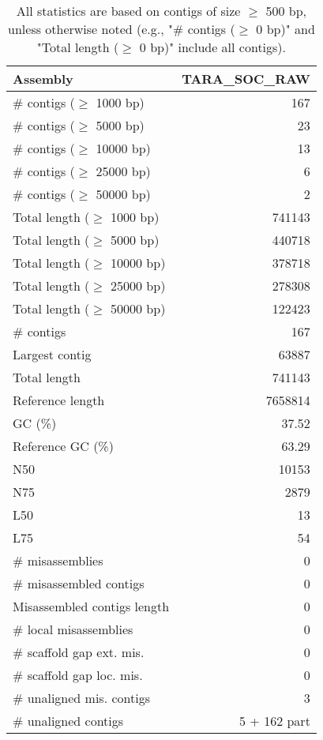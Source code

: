 \documentclass[12pt,a4paper]{article}
\begin{document}
\begin{table}[ht]
\begin{center}
\caption{All statistics are based on contigs of size $\geq$ 500 bp, unless otherwise noted (e.g., "\# contigs ($\geq$ 0 bp)" and "Total length ($\geq$ 0 bp)" include all contigs).}
\begin{tabular}{|l*{1}{|r}|}
\hline
Assembly & TARA\_SOC\_RAW \\ \hline
\# contigs ($\geq$ 1000 bp) & 167 \\ \hline
\# contigs ($\geq$ 5000 bp) & 23 \\ \hline
\# contigs ($\geq$ 10000 bp) & 13 \\ \hline
\# contigs ($\geq$ 25000 bp) & 6 \\ \hline
\# contigs ($\geq$ 50000 bp) & 2 \\ \hline
Total length ($\geq$ 1000 bp) & 741143 \\ \hline
Total length ($\geq$ 5000 bp) & 440718 \\ \hline
Total length ($\geq$ 10000 bp) & 378718 \\ \hline
Total length ($\geq$ 25000 bp) & 278308 \\ \hline
Total length ($\geq$ 50000 bp) & 122423 \\ \hline
\# contigs & 167 \\ \hline
Largest contig & 63887 \\ \hline
Total length & 741143 \\ \hline
Reference length & 7658814 \\ \hline
GC (\%) & 37.52 \\ \hline
Reference GC (\%) & 63.29 \\ \hline
N50 & 10153 \\ \hline
N75 & 2879 \\ \hline
L50 & 13 \\ \hline
L75 & 54 \\ \hline
\# misassemblies & 0 \\ \hline
\# misassembled contigs & 0 \\ \hline
Misassembled contigs length & 0 \\ \hline
\# local misassemblies & 0 \\ \hline
\# scaffold gap ext. mis. & 0 \\ \hline
\# scaffold gap loc. mis. & 0 \\ \hline
\# unaligned mis. contigs & 3 \\ \hline
\# unaligned contigs & 5 + 162 part \\ \hline

\end{tabular}
\end{center}
\end{table}
\end{document}
